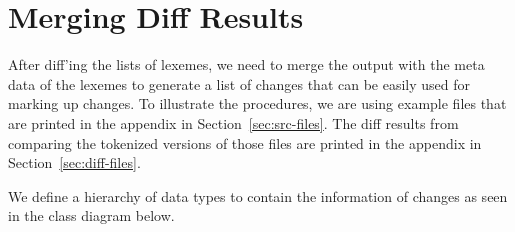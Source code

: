 \section{Merging Diff Results} 

After diff'ing the lists of lexemes, we need to merge the output with the meta data of the lexemes to generate a list of changes that can be easily used for marking up changes.  To illustrate the procedures, we are using example files that are printed in the appendix in Section~\ref{sec:src-files}.  The diff results from comparing the tokenized versions of those files are printed in the appendix in Section~\ref{sec:diff-files}.

We define a hierarchy of data types %
to contain the information of changes as seen in the class diagram below.  


